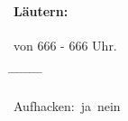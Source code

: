 
\pagebreak[3]
\paragraph{Läutern:} von 666 - 666 Uhr.
	\begin{tabbing}
		\hspace{1cm} \= \hspace{1cm} \= \hspace{1cm} \= \hspace{1cm} \= \hspace{1cm} \=\hspace{1cm} \=\hspace{1cm} \=\hspace{1cm} \= \kill
		
		

		\> \> \>Aufhacken: \> \> \CheckedBox\,ja \> \> \Square\,nein\\
		

		 
	\end{tabbing}


